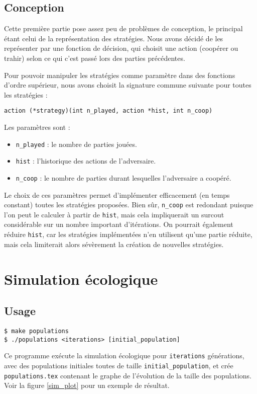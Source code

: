 \documentclass[10pt]{article}
\begin{document}
\subsection{Conception}
Cette première partie pose assez peu de problèmes de conception, 
le principal étant celui de la représentation des stratégies.
Nous avons décidé de les représenter par une fonction de décision, qui choisit une action
(coopérer ou trahir) selon ce qui c'est passé lors des parties précédentes.

Pour pouvoir manipuler les stratégies comme paramètre dans des fonctions d'ordre supérieur, 
nous avons choisit la signature commune suivante pour toutes les stratégies :
\begin{verbatim}
action (*strategy)(int n_played, action *hist, int n_coop)
\end{verbatim}

Les paramètres sont :
\begin{itemize}
\item \verb|n_played| : le nombre de parties jouées.
\item \verb|hist| : l'historique des actions de l'adversaire.
\item \verb|n_coop| : le nombre de parties durant lesquelles l'adversaire a coopéré.
\end{itemize}
Le choix de ces paramètres permet d'implémenter efficacement (en temps constant)
toutes les stratégies proposées. Bien sûr, \verb|n_coop| est redondant puisque
l'on peut le calculer à partir de \verb|hist|, mais cela impliquerait un surcout
considérable sur un nombre important d'itérations.
On pourrait également réduire \verb|hist|, car les stratégies implémentées n'en
utilisent qu'une partie réduite, mais cela limiterait alors sévèrement la
création de nouvelles stratégies.


\section{Simulation écologique}
\subsection{Usage}
\begin{verbatim}
$ make populations
$ ./populations <iterations> [initial_population]
\end{verbatim}

Ce programme exécute la simulation écologique pour \verb|iterations| générations,
avec des populations initiales toutes de taille \verb|initial_population|,
et crée \verb|populations.tex| contenant le graphe de l'évolution de la taille des populations.
Voir la figure \ref{sim_plot} pour un exemple de résultat.
\end{document}

